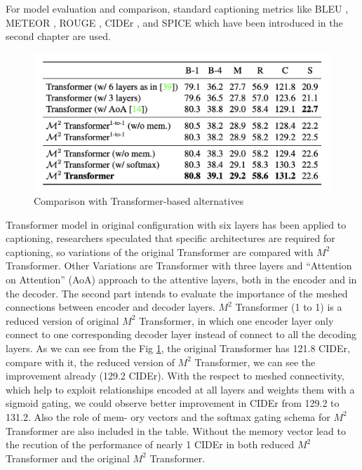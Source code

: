\documentclass[
]{krantz}
\begin{document}
For model evaluation and comparison, standard captioning metrics like BLEU \citep{papineni-etal-2002-bleu}, METEOR \citep{meteor}, ROUGE \citep{lin-2004-rouge}, CIDEr \citep{cider}, and SPICE \citep{spice} which have been introduced in the second chapter are used.



\begin{figure}

{\centering \includegraphics[width=1\linewidth]{figures/02-01/02-02 compare1} 

}

\caption{Comparison with Transformer-based alternatives \citep{cornia2020m2}}\label{fig:compare1}
\end{figure}

Transformer model in original configuration with six layers has been applied to captioning, researchers speculated that specific architectures are required for captioning, so variations of the original Transformer are compared with \(M^2\) Transformer. Other Variations are Transformer with three layers and ``Attention on Attention'' (AoA) approach \citep{huang1} to the attentive layers, both in the encoder and in the decoder. \citep{cornia2020m2}
The second part intends to evaluate the importance of the meshed connections between encoder and decoder layers. \(M^2\) Transformer (1 to 1) is a reduced version of original \(M^2\) Transformer, in which one encoder layer only connect to one corresponding decoder layer instead of connect to all the decoding layers.
As we can see from the Fig \ref{fig:compare1}, the original Transformer has 121.8 CIDEr, compare with it, the reduced version of \(M^2\) Transformer, we can see the improvement already (129.2 CIDEr). With the respect to meshed connectivity, which help to exploit relationships encoded at all layers and weights them with a sigmoid gating, we could observe better improvement in CIDEr from 129.2 to 131.2. Also the role of mem- ory vectors and the softmax gating schema for \(M^2\) Transformer are also included in the table. Without the memory vector lead to the recution of the performance of nearly 1 CIDEr in both reduced \(M^2\) Transformer and the original \(M^2\) Transformer.\citep{cornia2020m2}
\end{document}
